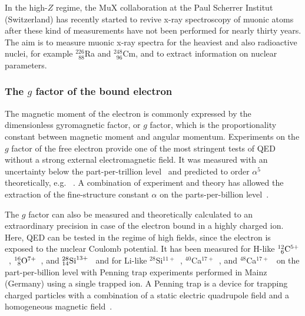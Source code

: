 In the high-$Z$ regime, the MuX collaboration at the Paul Scherrer Institut (Switzerland) has recently started to revive x-ray spectroscopy of muonic atoms after these kind of measurements have not been performed for nearly thirty years.
The aim is to measure muonic x-ray spectra for the heaviest and also radioactive nuclei, for example $^{226}_{\phantom{1}88}$Ra and $^{248}_{\phantom{1}96}$Cm, and to extract information on nuclear parameters. 

\subsubsection*{The $g$ factor of the bound electron}
The magnetic moment of the electron is commonly expressed by the dimensionless gyromagnetic factor, or $g$ factor, which is the proportionality constant between magnetic moment and angular momentum. Experiments on the $g$ factor of the free electron provide one of the most stringent tests of QED without a strong external electromagnetic field. It was measured with an uncertainty below the part-per-trillion level~\cite{odom2006,hanneke2008} and predicted to order $\alpha^5$ theoretically, e.g.~  \cite{schwinger1948,Peterman57,Sommerfield1957,Sommerfield58,Laporta96,kinoshita2006,aoyama2007,aoyama2015,aoyama2017}. A combination of experiment and theory has allowed the extraction of the fine-structure constant $\alpha$ on the parts-per-billion level~\cite{gabrielse2006,gabrielse2007}.

The $g$ factor can also be measured and theoretically calculated to an extraordinary precision in case of the electron bound in a highly charged ion. Here, QED can be tested in the regime of high fields, since the electron is exposed to the nuclear Coulomb potential. It has been measured for H-like $^{12}_{\phantom{0}6}\rm{C}^{5+}$~\cite{Haffner2000,Sturm2014}, $^{16}_{\phantom{0}8}\rm{O}^{7+}$~\cite{Verdu2004}, and $^{28}_{14}\rm{Si}^{13+}$~\cite{Sturm2011} and for Li-like $^{28}$Si$^{11+}$~\cite{sturm2013}, $^{40}$Ca$^{17+}$~\cite{Kohler2016}, and $^{48}$Ca$^{17+}$~\cite{Kohler2016} on the part-per-billion level with Penning trap experiments performed in Mainz (Germany) using a single trapped ion. A Penning trap is a device for trapping charged particles with a combination of a static electric quadrupole field and a homogeneous magnetic field~\cite{annphysgfactor,geoniumtheory}. 

